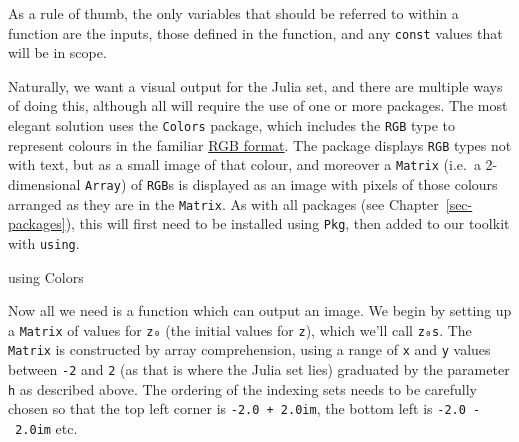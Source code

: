 \documentclass[
  letterpaper,
  DIV=11,
  numbers=noendperiod]{scrreprt}
\newenvironment{Shaded}{\begin{snugshade}}{\end{snugshade}}
\newcommand{\BuiltInTok}[1]{\textcolor[rgb]{0.00,0.23,0.31}{#1}}
\newcommand{\ImportTok}[1]{\textcolor[rgb]{0.00,0.46,0.62}{#1}}
\begin{document}
\begin{tcolorbox}[enhanced jigsaw, toprule=.15mm, opacitybacktitle=0.6, leftrule=.75mm, breakable, coltitle=black, bottomrule=.15mm, colbacktitle=quarto-callout-tip-color!10!white, bottomtitle=1mm, rightrule=.15mm, title=\textcolor{quarto-callout-tip-color}{\faLightbulb}\hspace{0.5em}{Convention}, colframe=quarto-callout-tip-color-frame, left=2mm, colback=white, opacityback=0, arc=.35mm, toptitle=1mm, titlerule=0mm]

As a rule of thumb, the only variables that should be referred to within
a function are the inputs, those defined in the function, and any
\texttt{const} values that will be in scope.

\end{tcolorbox}

Naturally, we want a visual output for the Julia set, and there are
multiple ways of doing this, although all will require the use of one or
more packages. The most elegant solution uses the \texttt{Colors}
package, which includes the \texttt{RGB} type to represent colours in
the familiar \href{https://en.wikipedia.org/wiki/RGB_color_model}{RGB
format}. The package displays \texttt{RGB} types not with text, but as a
small image of that colour, and moreover a \texttt{Matrix} (i.e.~a
2-dimensional \texttt{Array}) of \texttt{RGB}s is displayed as an image
with pixels of those colours arranged as they are in the
\texttt{Matrix}. As with all packages (see Chapter~\ref{sec-packages}),
this will first need to be installed using \texttt{Pkg}, then added to
our toolkit with \texttt{using}.

\begin{Shaded}
\begin{Highlighting}[]
\ImportTok{using} \BuiltInTok{Colors}
\end{Highlighting}
\end{Shaded}

Now all we need is a function which can output an image. We begin by
setting up a \texttt{Matrix} of values for \texttt{z₀} (the initial
values for \texttt{z}), which we'll call \texttt{z₀s}. The
\texttt{Matrix} is constructed by array comprehension, using a range of
\texttt{x} and \texttt{y} values between \texttt{-2} and \texttt{2} (as
that is where the Julia set lies) graduated by the parameter \texttt{h}
as described above. The ordering of the indexing sets needs to be
carefully chosen so that the top left corner is \texttt{-2.0\ +\ 2.0im},
the bottom left is \texttt{-2.0\ -\ 2.0im} etc.
\end{document}
